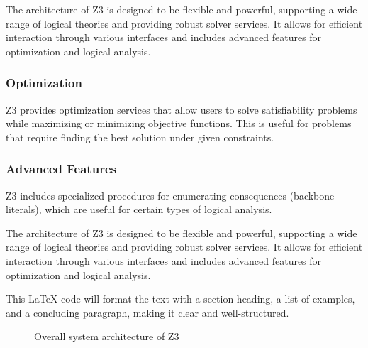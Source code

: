 \documentclass[]{rptuseminar}
\begin{document}
The architecture of Z3 is designed to be flexible and powerful, supporting a wide range of logical theories and providing
 robust solver services. It allows for efficient interaction through various interfaces and includes advanced features for
  optimization and logical analysis.

\subsubsection{Optimization}
Z3 provides optimization services that allow users to solve satisfiability problems while maximizing or minimizing objective functions. 
This is useful for problems that require finding the best solution under given constraints.

\subsubsection{Advanced Features}
Z3 includes specialized procedures for enumerating consequences (backbone literals), which are useful for certain types of logical analysis.


The architecture of Z3 is designed to be flexible and powerful, 
supporting a wide range of logical theories and providing robust solver services. It allows for efficient interaction through 
various interfaces and includes advanced features for optimization and logical analysis.

This LaTeX code will format the text with a section heading, a list of examples, and a concluding paragraph, making it clear 
and well-structured.


\begin{figure}[ht]
  \begin{center}
  \end{center}
  \caption{%
     Overall system architecture of Z3
    \cite{nikolaj_bjorner_programming_nodate}
  }
  \label{fig:scholar} %
\end{figure}
\end{document}

